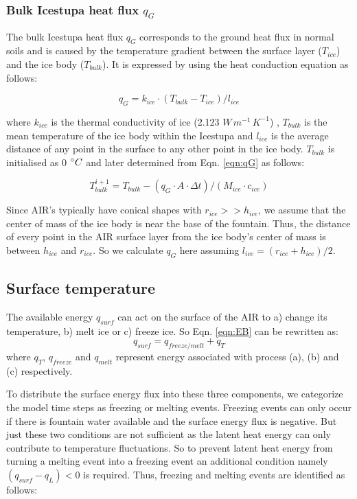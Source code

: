 \documentclass[utf8]{frontiersSCNS} %
\begin{document}
\subsubsection{Bulk Icestupa heat flux \texorpdfstring{$q_{G}$}{Lg}} \label{sec:Bulkflux}
The bulk Icestupa heat flux $q_{G}$ corresponds to the ground heat flux in normal soils and is caused by the temperature
gradient between the surface layer ($T_{ice}$) and the ice body ($T_{bulk}$). It is expressed by using the heat
conduction equation as follows:

\begin{equation} q_{G} = k_{ice} \cdot (T_{bulk}-T_{ice})/l_{ice} \label{eqn:qG}    \end{equation}

where $k_{ice}$ is the thermal conductivity of ice (2.123 $W\, m^{-1}\,K^{-1}$) , $T_{bulk}$ is the mean temperature of
the ice body within the Icestupa and $l_{ice}$ is the average distance of any point in the surface to any other point in
the ice body. $T_{bulk}$ is initialised as 0 $\degree C$ and later determined from Eqn. \ref{eqn:qG} as follows:

\begin{equation} T_{bulk}^{i+1} = T_{bulk} - (q_{G} \cdot A \cdot \Delta t)/(M_{ice} \cdot c_{ice}) \end{equation}

Since AIR's typically have conical shapes with $r_{ice} >> h_{ice}$, we assume that the center of mass of the ice body
is near the base of the fountain. Thus, the distance of every point in the AIR surface layer from the ice body's center
of mass is between $h_{ice}$ and $r_{ice}$. So we calculate $q_{G}$ here assuming $l_{ice} = (r_{ice} + h_{ice})/2$.

\subsection{Surface temperature}
The available energy $q_{surf}$ can act on the surface of the AIR to a) change its temperature, b) melt ice or
c) freeze ice. So Eqn. \ref{eqn:EB} can be rewritten as: \begin{equation} q_{surf} = q_{freeze/melt} +
	q_{T} \end{equation}
where $q_{T}$, $q_{freeze}$ and $q_{melt}$ represent energy associated with process (a), (b) and (c) respectively.

To distribute the surface energy flux into these three components, we categorize the model time steps as freezing or
melting events. Freezing events can only occur if there is fountain water available and the surface energy flux is
negative. But just these two conditions are not sufficient as the latent heat energy can only contribute to temperature
fluctuations. So to prevent latent heat energy from turning a melting event into a freezing event an additional
condition namely $(q_{surf}-q_{L}) < 0$ is required. Thus, freezing and melting events are identified as follows:
\end{document}
